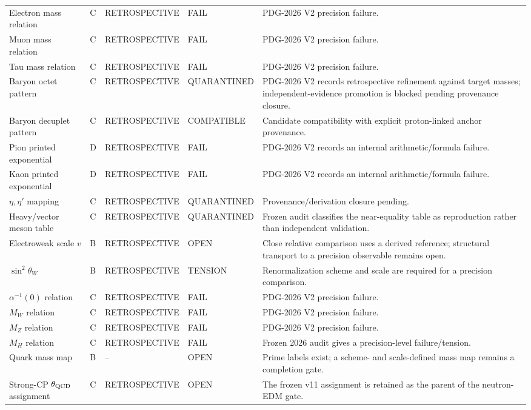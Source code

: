 {\begin{longtable}{p{}p{}p{}p{}p{}}
\midrule
Electron mass relation & C & RETROSPECTIVE & FAIL & PDG-2026 V2 precision failure. \\
Muon mass relation & C & RETROSPECTIVE & FAIL & PDG-2026 V2 precision failure. \\
Tau mass relation & C & RETROSPECTIVE & FAIL & PDG-2026 V2 precision failure. \\
\midrule
Baryon octet pattern & C & RETROSPECTIVE & QUARANTINED & PDG-2026 V2 records retrospective refinement against target masses; independent-evidence promotion is blocked pending provenance closure. \\
Baryon decuplet pattern & C & RETROSPECTIVE & COMPATIBLE & Candidate compatibility with explicit proton-linked anchor provenance. \\
Pion printed exponential & D & RETROSPECTIVE & FAIL & PDG-2026 V2 records an internal arithmetic/formula failure. \\
Kaon printed exponential & D & RETROSPECTIVE & FAIL & PDG-2026 V2 records an internal arithmetic/formula failure. \\
$\eta,\eta'$ mapping & C & RETROSPECTIVE & QUARANTINED & Provenance/derivation closure pending. \\
Heavy/vector meson table & C & RETROSPECTIVE & QUARANTINED & Frozen audit classifies the near-equality table as reproduction rather than independent validation. \\
\midrule
Electroweak scale $v$ & B & RETROSPECTIVE & OPEN & Close relative comparison uses a derived reference; structural transport to a precision observable remains open. \\
$\sin^2\theta_W$ & B & RETROSPECTIVE & TENSION & Renormalization scheme and scale are required for a precision comparison. \\
$\alpha^{-1}(0)$ relation & C & RETROSPECTIVE & FAIL & PDG-2026 V2 precision failure. \\
$M_W$ relation & C & RETROSPECTIVE & FAIL & PDG-2026 V2 precision failure. \\
$M_Z$ relation & C & RETROSPECTIVE & FAIL & PDG-2026 V2 precision failure. \\
$M_H$ relation & C & RETROSPECTIVE & FAIL & Frozen 2026 audit gives a precision-level failure/tension. \\
Quark mass map & B & -- & OPEN & Prime labels exist; a scheme- and scale-defined mass map remains a completion gate. \\
\midrule
Strong-CP $\theta_{\rm QCD}$ assignment & C & RETROSPECTIVE & OPEN & The frozen v11 assignment is retained as the parent of the neutron-EDM gate. \\

\end{longtable}}
